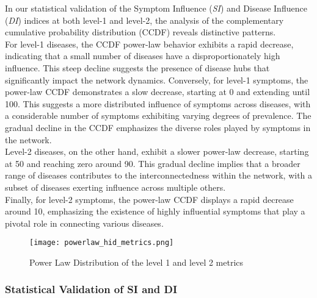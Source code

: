 In our statistical validation of the Symptom Influence (\textit{SI}) and Disease Influence (\textit{DI}) indices at both level-1 and level-2,
the analysis of the complementary cumulative probability distribution (CCDF) reveals distinctive patterns.\\
For level-1 diseases, the CCDF power-law behavior exhibits a rapid decrease, indicating that a small number of diseases
have a disproportionately high influence. This steep decline suggests the presence of disease hubs that significantly impact the network dynamics.
Conversely, for level-1 symptoms, the power-law CCDF demonstrates a slow decrease, starting at 0 and extending until 100.
This suggests a more distributed influence of symptoms across diseases, with a considerable number of symptoms exhibiting
varying degrees of prevalence. The gradual decline in the CCDF emphasizes the diverse roles played by symptoms in the network.\\
Level-2 diseases, on the other hand, exhibit a slower power-law decrease, starting at 50 and reaching zero around 90.
This gradual decline implies that a broader range of diseases contributes to the interconnectedness within the network,
with a subset of diseases exerting influence across multiple others.\\
Finally, for level-2 symptoms, the power-law CCDF displays a rapid decrease around 10,
emphasizing the existence of highly influential symptoms that play a pivotal role in connecting various diseases.

\begin{figure}[H]
    \centering
    \texttt{[image: powerlaw\_hid\_metrics.png]}
    \caption{Power Law Distribution of the level 1 and level 2 metrics}
    \label{fig:powerlaw_hid_metrics}
\end{figure}
\subsubsection*{Statistical Validation of SI and DI}

